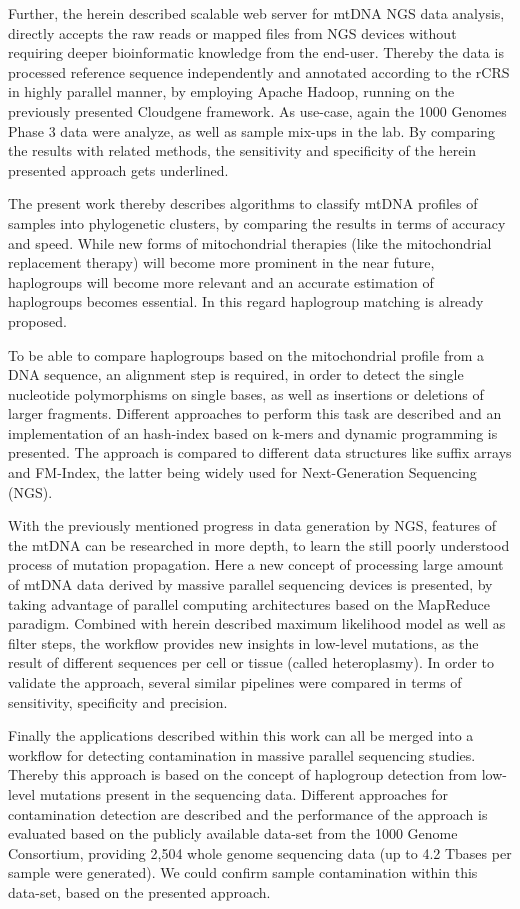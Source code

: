 Further, the herein described scalable web server for mtDNA NGS data analysis, directly accepts the raw reads or mapped files from NGS devices without requiring deeper bioinformatic knowledge from the end-user. Thereby the data is processed reference sequence independently and annotated according to the rCRS in highly parallel manner, by employing Apache Hadoop, running on the previously presented Cloudgene framework. As use-case, again the 1000 Genomes Phase 3 data were analyze, as well as sample mix-ups in the lab. By comparing the results with related methods, the sensitivity and specificity of the herein presented approach gets underlined.

The present work thereby describes algorithms to classify mtDNA profiles of samples into phylogenetic clusters, by comparing the results in terms of accuracy and speed. While new forms of mitochondrial therapies (like the mitochondrial replacement therapy) will become more prominent in the near future, haplogroups will become more relevant and an accurate estimation of haplogroups becomes essential. In this regard haplogroup matching is already proposed. 

To be able to compare haplogroups based on the mitochondrial profile from a DNA sequence, an alignment step is required, in order to detect the single nucleotide polymorphisms on single bases, as well as insertions or deletions of larger fragments. Different approaches to perform this task are described and an implementation of an hash-index based on k-mers and dynamic programming is presented. The approach is compared to different data structures like suffix arrays and FM-Index, the latter being widely used for Next-Generation Sequencing (NGS). 

With the previously mentioned progress in data generation by NGS, features of the mtDNA can be researched in more depth, to learn the still poorly understood process of mutation propagation. Here a new concept of processing large amount of mtDNA data derived by massive parallel sequencing devices is presented, by taking advantage of parallel computing architectures based on the MapReduce paradigm. Combined with herein described maximum likelihood model as well as filter steps, the workflow provides new insights in low-level mutations, as the result of different sequences per cell or tissue (called heteroplasmy). In order to validate the approach, several similar pipelines were compared in terms of sensitivity, specificity and precision. 

Finally the applications described within this work can all be merged into a workflow for detecting contamination in massive parallel sequencing studies. Thereby this approach is based on the concept of haplogroup detection from low-level mutations present in the sequencing data. Different approaches for contamination detection are described and the performance of the approach is evaluated based on the publicly available data-set from the 1000 Genome Consortium, providing 2,504 whole genome sequencing data (up to 4.2 Tbases per sample were generated). We could confirm sample contamination within this data-set, based on the presented approach.

